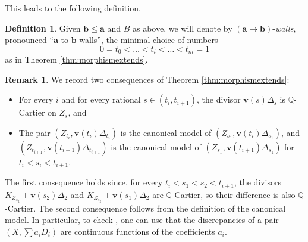 \documentclass[11pt]{amsart}
\newcommand{\margg}[1]{\normalsize{{\color{red}\footnote{{\color{red}#1}}}{\marginpar[{\color{red}\hfill\tiny\thefootnote$\rightarrow$}]{{\color{red}$\leftarrow$\tiny\thefootnote}}}}}
\newcommand{\DGK}[1]{\margg{(DGK) #1}}
\theoremstyle{definition}
\newtheorem{definition}[theorem]{Definition}
\newtheorem{remark}[theorem]{Remark}
\theoremstyle{remark}
\newcommand{\bQ}{{\mathbb Q}}
\newcommand{\calN}{\mathcal N}
\newcommand{\bfa}{\mathbf{a}}
\newcommand{\bfb}{\mathbf{b}}
\begin{document}
	This leads to the following definition.
	
	\begin{definition}\label{definiton:walls}
		Given  $\mathbf{b} \le \mathbf{a} $ and $B$ as above, we will denote by $(\mathbf{a}\to\mathbf{b})$-\emph{walls}, pronounced ``$\bfa$-to-$\bfb$ walls'', the minimal choice of numbers $$0 = t_0 <  \ldots < t_i < \ldots < t_m = 1$$ as in Theorem \ref{thm:morphismextends}. 
	\end{definition}
	
	
	\begin{remark}\label{remark:consequences:second:bullett:thm:4.4}
		We record two consequences of Theorem \ref{thm:morphismextends}:
		\begin{itemize}
			\item For every $i$ and for every rational $s \in (t_i, t_{i+1})$, the divisor $ \mathbf{v}(s) \Delta_{s} $ is $\bQ$-Cartier on $Z_{s}$, and
			\item The pair $\left(Z_{t_i}, \mathbf{v}(t_i) \Delta_{t_i} \right)$ is the canonical model of $\left(Z_{s_{1}}, \mathbf{v}(t_i) \Delta_{s_{1}} \right)$, and $\left(Z_{t_{i+1}}, \mathbf{v}(t_{i+1}) \Delta_{t_{i+1}} \right)$ is the canonical model of $\left(Z_{s_{1}}, \mathbf{v}(t_{i+1}) \Delta_{s_{1}} \right)$ for $t_i < s_i < t_{i + 1}$. \end{itemize}
		
		
		The first consequence holds since, for every $t_i<s_1<s_2<t_{i+1}$,
		the  divisors $K_{Z_{s_2}}+\mathbf{v}(s_2)\Delta_2$ and $K_{Z_{s_2}}+\mathbf{v}(s_1)\Delta_2$ are $\mathbb{Q}$-Cartier, so their difference is also $\mathbb{Q}$-Cartier.
		The second consequence follows from the definition of the canonical model. In particular, to check \cite[Definition 3.50 (4)]{KM98}, one can use that the discrepancies of a pair $(X,\sum a_i D_i)$ are continuous functions of the coefficients $a_i$.
	\end{remark}%
	
\end{document}
